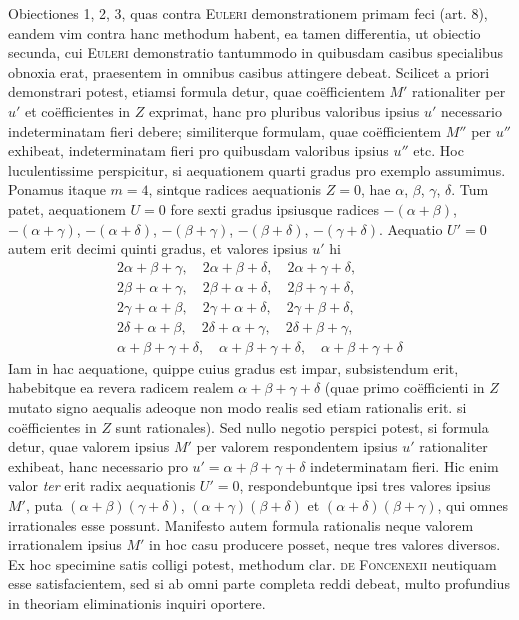 Obiectiones 1, 2, 3, quas contra \textsc{Euleri} demonstrationem primam feci (art. 8), eandem vim contra hanc methodum habent, ea tamen differentia, ut obiectio secunda, cui \textsc{Euleri} demonstratio tantummodo in quibusdam casibus specialibus obnoxia erat, praesentem in omnibus casibus attingere debeat. Scilicet a priori demonstrari potest, etiamsi formula detur, quae coëfficientem $M'$ rationaliter per $u'$ et coëfficientes in $Z$ exprimat, hanc pro pluribus valoribus ipsius $u'$ necessario indeterminatam fieri debere; similiterque formulam, quae coëfficientem $M''$ per $u''$ exhibeat, indeterminatam fieri pro quibusdam valoribus ipsius $u''$ etc. Hoc luculentissime perspicitur, si aequationem quarti gradus pro exemplo assumimus. Ponamus itaque $m=4$, sintque radices aequationis $Z=0$, hae $\alpha$, $\beta$, $\gamma$, $\delta$. Tum patet, aequationem $U=0$ fore sexti gradus ipsiusque radices $-(\alpha+\beta)$, $-(\alpha+\gamma)$, $-(\alpha+\delta)$, $-(\beta+\gamma)$, $-(\beta+\delta)$, $-(\gamma+\delta)$. Aequatio $U'=0$ autem erit decimi quinti gradus, et valores ipsius $u'$ hi
\[
\begin{gathered}
2\alpha+\beta+\gamma,\quad 2\alpha+\beta+\delta,\quad 2\alpha+\gamma+\delta,\\
2\beta+\alpha+\gamma,\quad 2\beta+\alpha+\delta,\quad 2\beta+\gamma+\delta,\\
2\gamma+\alpha+\beta,\quad 2\gamma+\alpha+\delta,\quad 2\gamma+\beta+\delta,\\
2\delta+\alpha+\beta,\quad 2\delta+\alpha+\gamma,\quad 2\delta+\beta+\gamma,\\
\alpha+\beta+\gamma+\delta,\quad\alpha+\beta+\gamma+\delta,\quad\alpha+\beta+\gamma+\delta
\end{gathered}
\]
Iam in hac aequatione, quippe cuius gradus est impar, subsistendum erit, habebitque ea revera radicem realem $\alpha+\beta+\gamma+\delta$ (quae primo coëfficienti in $Z$ mutato signo aequalis adeoque non modo realis sed etiam rationalis erit. si coëfficientes in $Z$ sunt rationales). Sed nullo negotio perspici potest, si formula detur, quae valorem ipsius $M'$ per valorem respondentem ipsius $u'$ rationaliter exhibeat, hanc necessario pro $u'=\alpha+\beta+\gamma+\delta$ indeterminatam fieri. Hic enim valor \textit{ter} erit radix aequationis $U'=0$, respondebuntque ipsi tres valores ipsius $M'$, puta $(\alpha+\beta)(\gamma+\delta)$, $(\alpha+\gamma)(\beta+\delta)$ et $(\alpha+\delta)(\beta+\gamma)$, qui omnes irrationales esse possunt. Manifesto autem formula rationalis neque valorem irrationalem ipsius $M'$ in hoc casu producere posset, neque tres valores diversos. Ex hoc specimine satis colligi potest, methodum clar. \textsc{de Foncenexii} neutiquam esse satisfacientem, sed si ab omni parte completa reddi debeat, multo profundius in theoriam eliminationis inquiri oportere.

